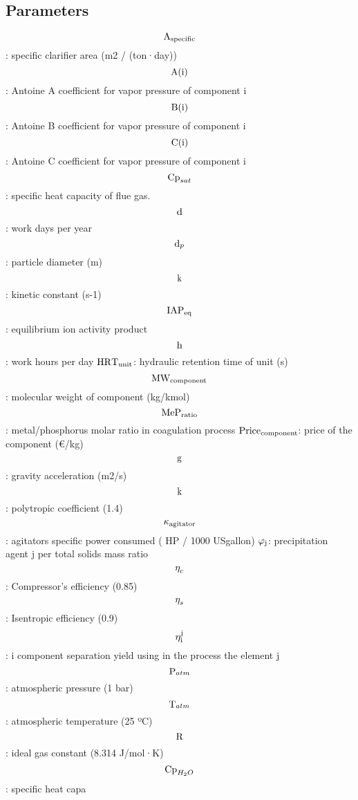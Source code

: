 \documentclass[10pt,a4paper]{article}
\begin{document}
\subsection{Parameters}
\[{{\rm{A}}_{{\rm{specific}}}}\]: specific clarifier area (m2 / (ton·day))
\[{\rm{A(i)}}\]: Antoine A coefficient for vapor pressure of component i
\[{\rm{B(i)}}\]: Antoine B coefficient for vapor pressure of component i
\[{\rm{C(i)}}\]: Antoine C coefficient for vapor pressure of component i
\[{{\mathop{\rm Cp}\nolimits} _{sat}}\]: specific heat capacity of flue gas.
\[{\mathop{\rm d}\nolimits} \]: work days per year
\[{{\mathop{\rm d}\nolimits} _p}\]: particle diameter  (m)
\[{\rm{k}}\]: kinetic constant (s-1)
\[{\rm{IA}}{{\rm{P}}_{{\rm{eq}}}}\]: equilibrium ion activity product
\[{\mathop{\rm h}\nolimits} \]: work hours per day
\({\rm{HR}}{{\rm{T}}_{{\rm{unit}}}}\): hydraulic retention time of unit (s)
\[{\rm{M}}{{\rm{W}}_{{\rm{component}}}}\]: molecular weight of component (kg/kmol)
\[{\rm{Me}}{{\rm{P}}_{{\rm{ratio}}}}\]: metal/phosphorus molar ratio in coagulation process
\({\rm{Pric}}{{\rm{e}}_{{\rm{component}}}}\): price of the component (€/kg)
\[{\mathop{\rm g}\nolimits} \]: gravity acceleration (m2/s)
\[{\mathop{\rm k}\nolimits} \]: polytropic coefficient (1.4)
\[{{\rm{\kappa }}_{{\rm{agitator}}}}\]: agitators specific power consumed ( HP / 1000 USgallon)
\({{\rm{\varphi }}_{\rm{j}}}\): precipitation agent j per total solids mass ratio
\[{\rm{\eta }}_c^{}\]: Compressor’s efficiency (0.85)
\[{\rm{\eta }}_s^{}\]: Isentropic efficiency (0.9)
\[{\rm{\eta }}_{\rm{i}}^{\rm{j}}\]: i component separation yield using in the process the element j
\[{{\mathop{\rm P}\nolimits} _{atm}}\]: atmospheric pressure (1 bar)
\[{{\mathop{\rm T}\nolimits} _{atm}}\]: atmospheric temperature (25 ºC)
\[{\mathop{\rm R}\nolimits} \]: ideal gas constant (8.314 J/mol·K)
\[{{\mathop{\rm Cp}\nolimits} _{{H_2}O}}\]: specific heat capa
\end{document}
